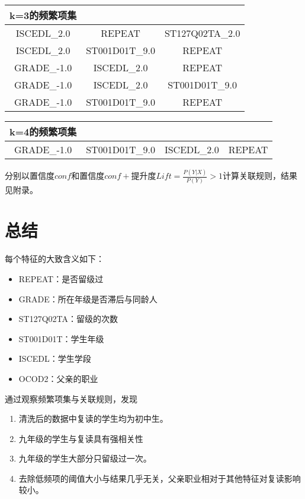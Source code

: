 \documentclass[12pt, a4paper, oneside]{ctexart}
\begin{document}
\begin{table}[h]
    \centering
    \begin{tabular}{ccc}
    \toprule
    k=3的频繁项集                                     \\
    \midrule
    ISCEDL\_2.0&REPEAT&ST127Q02TA\_2.0\\
    ISCEDL\_2.0&ST001D01T\_9.0&REPEAT\\
    GRADE\_-1.0&ISCEDL\_2.0&REPEAT\\
    GRADE\_-1.0&ISCEDL\_2.0&ST001D01T\_9.0\\
    GRADE\_-1.0&ST001D01T\_9.0&REPEAT\\
    \bottomrule
    \end{tabular}
\end{table}
\begin{table}[h]
    \centering
    \begin{tabular}{cccc}
    \toprule
    k=4的频繁项集                                     \\
    \midrule
    GRADE\_-1.0&ST001D01T\_9.0&ISCEDL\_2.0&REPEAT\\
    \bottomrule
    \end{tabular}
\end{table}
\clearpage
分别以置信度$conf$和置信度$conf + $提升度$Lift = \frac{P(Y | X)}{P(Y)} > 1$计算关联规则，结果见附录。



\section{总结}
每个特征的大致含义如下：
\begin{itemize}
    \item REPEAT：是否留级过
    \item GRADE：所在年级是否滞后与同龄人
    \item ST127Q02TA：留级的次数
    \item ST001D01T：学生年级
    \item ISCEDL：学生学段
    \item OCOD2：父亲的职业
\end{itemize}

通过观察频繁项集与关联规则，发现
\begin{enumerate}
    \item 清洗后的数据中复读的学生均为初中生。
    \item 九年级的学生与复读具有强相关性
    \item 九年级的学生大部分只留级过一次。
    \item 去除低频项的阈值大小与结果几乎无关，父亲职业相对于其他特征对复读影响较小。
\end{enumerate}
\end{document}
